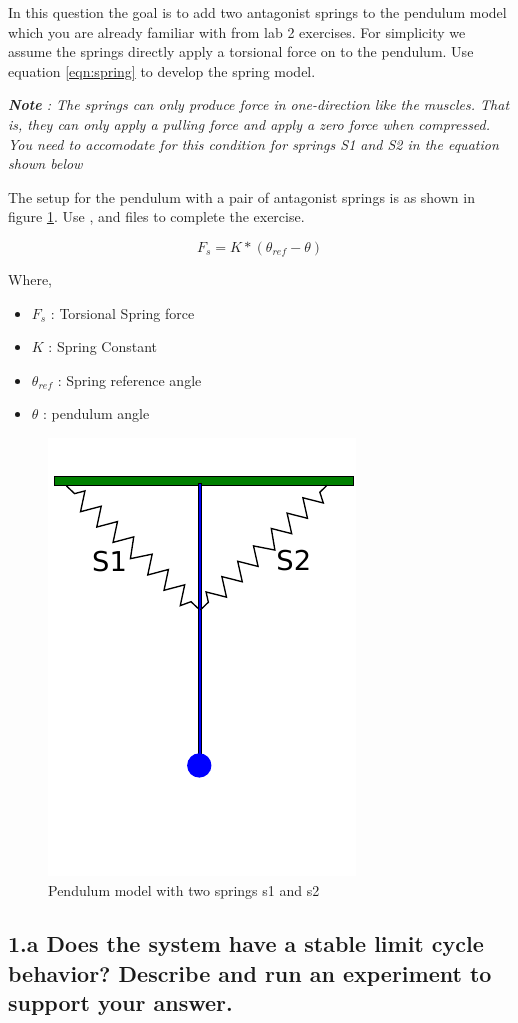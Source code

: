 \documentclass{cmc}
\begin{document}
In this question the goal is to add two antagonist springs to the
pendulum model which you are already familiar with from lab 2
exercises. For simplicity we assume the springs directly apply a
torsional force on to the pendulum.  Use equation \ref{eqn:spring} to
develop the spring model.

\textit{\textbf{Note} : The springs can only produce force in
  one-direction like the muscles.  That is, they can only apply a
  pulling force and apply a zero force when compressed.  You need to
  accomodate for this condition for springs S1 and S2 in the equation
  shown below}

The setup for the pendulum with a pair of antagonist springs is as
shown in figure \ref{fig:pendulum_spring}. Use ,
 and  files to
complete the exercise.

\begin{equation}
  \label{eqn:spring}
  F_{s} = K*(\theta_{ref} - \theta)
\end{equation}

Where,
\begin{itemize}
\item $F_{s}$ : Torsional Spring force
\item $K$ : Spring Constant
\item $\theta_{ref}$ : Spring reference angle
\item $\theta$ : pendulum angle
\end{itemize}


\begin{figure}[H]
  \centering
  \includegraphics[width=.3\textwidth]{figures/pendulum_spring}
  \caption[pendulum with spring]{Pendulum model with two springs s1
    and s2}
  \label{fig:pendulum_spring}
\end{figure}


\subsection*{1.a Does the system have a stable limit cycle behavior?
  Describe and run an experiment to support your answer.}
\label{subsec:1.a}
\end{document}
